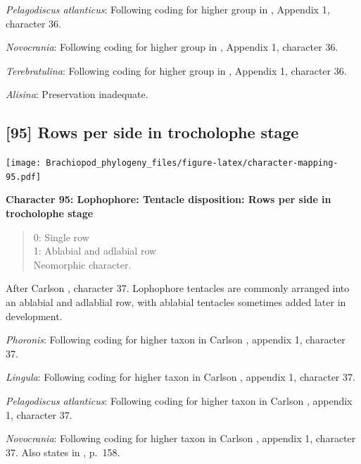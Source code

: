 \documentclass[]{book}
\theoremstyle{definition}
\theoremstyle{definition}
\theoremstyle{definition}
\theoremstyle{remark}
\begin{document}
\emph{Pelagodiscus atlanticus}: Following coding for higher group in
\citet{Carlson1995Phylogeneticrelationships}, Appendix 1, character 36.

\emph{Novocrania}: Following coding for higher group in
\citet{Carlson1995Phylogeneticrelationships}, Appendix 1, character 36.

\emph{Terebratulina}: Following coding for higher group in
\citet{Carlson1995Phylogeneticrelationships}, Appendix 1, character 36.

\emph{Alisina}: Preservation inadequate.

\hypertarget{rows-per-side-in-trocholophe-stage}{%
\subsection*{{[}95{]} Rows per side in trocholophe
stage}\label{rows-per-side-in-trocholophe-stage}}

\texttt{[image: Brachiopod\_phylogeny\_files/figure-latex/character-mapping-95.pdf]}

\textbf{Character 95: Lophophore: Tentacle disposition: Rows per side in
trocholophe stage}

\begin{quote}
0: Single row\\
1: Ablabial and adlabial row\\
Neomorphic character.
\end{quote}

After Carlson \citeyearpar{Carlson1995Phylogeneticrelationships},
character 37. Lophophore tentacles are commonly arranged into an
ablabial and adlablial row, with ablabial tentacles sometimes added
later in development.

\emph{Phoronis}: Following coding for higher taxon in Carlson
\citeyearpar{Carlson1995Phylogeneticrelationships}, appendix 1,
character 37.

\emph{Lingula}: Following coding for higher taxon in Carlson
\citeyearpar{Carlson1995Phylogeneticrelationships}, appendix 1,
character 37.

\emph{Pelagodiscus atlanticus}: Following coding for higher taxon in
Carlson \citeyearpar{Carlson1995Phylogeneticrelationships}, appendix 1,
character 37.

\emph{Novocrania}: Following coding for higher taxon in Carlson
\citeyearpar{Carlson1995Phylogeneticrelationships}, appendix 1,
character 37. Also states in
\citet{Williams2000BrachiopodaLinguliformea}, p.~158.
\end{document}
